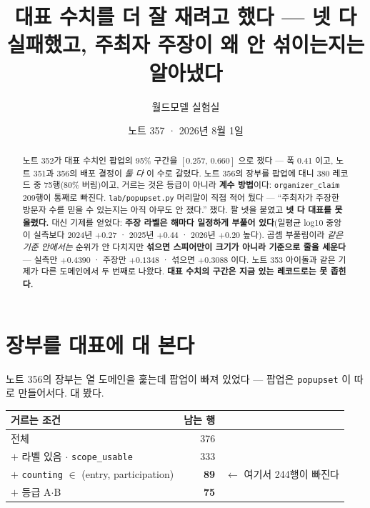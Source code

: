 \documentclass[11pt]{article}
\begin{document}
\title{대표 수치를 더 잘 재려고 했다 --- 넷 다 실패했고, 주최자 주장이 왜 안 섞이는지는 알아냈다}
\author{월드모델 실험실}
\date{노트 357 · 2026년 8월 1일}
\maketitle

\begin{abstract}
노트 352가 대표 수치인 팝업의 95\% 구간을 $[0.257,\,0.660]$ 으로 쟀다 ---
폭 0.41 이고, 노트 351과 356의 배포 결정이 \emph{둘 다} 이 수로 갈렸다.
노트 356의 장부를 팝업에 대니 380 레코드 중 75행(80\% 버림)이고, 거르는
것은 등급이 아니라 \textbf{계수 방법}이다: \texttt{organizer\_claim} 209행이
통째로 빠진다. \texttt{lab/popupset.py} 머리말이 직접 적어 뒀다 --- ``주최자가
주장한 방문자 수를 믿을 수 있는지는 아직 아무도 안 쟀다.'' 쟀다. 팔 넷을
붙였고 \textbf{넷 다 대표를 못 올렸다.} 대신 기제를 얻었다:
\textbf{주장 라벨은 해마다 일정하게 부풀어 있다}(일평균 log10 중앙이
실측보다 2024년 $+0.27$ · 2025년 $+0.44$ · 2026년 $+0.20$ 높다). 곱셈
부풀림이라 \emph{같은 기준 안에서는} 순위가 안 다치지만 \textbf{섞으면
스피어만이 크기가 아니라 기준으로 줄을 세운다} --- 실측만 $+0.4390$ ·
주장만 $+0.1348$ · 섞으면 $+0.3088$ 이다. 노트 353 아이돌과 같은 기제가
다른 도메인에서 두 번째로 나왔다. \textbf{대표 수치의 구간은 지금 있는
레코드로는 못 좁힌다.}
\end{abstract}

\section{장부를 대표에 대 본다}

노트 356의 장부는 열 도메인을 훑는데 팝업이 빠져 있었다 --- 팝업은
\texttt{popupset} 이 따로 만들어서다. 대 봤다.

\begin{center}
\begin{tabular}{lrl}
\hline
거르는 조건 & 남는 행 & \\
\hline
전체                                & 376 & \\
$+$ 라벨 있음 $\cdot$ \texttt{scope\_usable} & 333 & \\
$+$ \texttt{counting} $\in$ (entry, participation) & \textbf{89} & $\leftarrow$ 여기서 244행이 빠진다 \\
$+$ 등급 A$\cdot$B                   & \textbf{75} & \\
\hline
\end{tabular}
\end{center}
\end{document}
